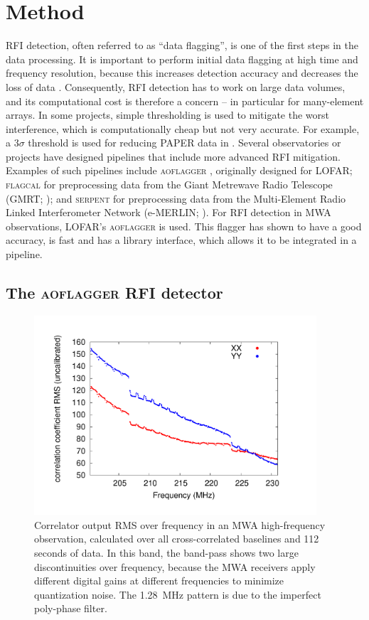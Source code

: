 \documentclass{pasa}
\begin{document}
\section{Method}
RFI detection, often referred to as ``data flagging'', is one of the first steps in the data processing. It is important to perform initial data flagging at high time and frequency resolution, because this increases detection accuracy and decreases the loss of data \citep{lofar-radio-environment}. Consequently, RFI detection has to work on large data volumes, and its computational cost is therefore a concern -- in particular for many-element arrays. In some projects, simple thresholding is used to mitigate the worst interference, which is computationally cheap but not very accurate. For example, a $3\sigma$ threshold is used for reducing PAPER data in \citet{parsons-paper-eorlimit-2014}. Several observatories or projects have designed pipelines that include more advanced RFI mitigation. Examples of such pipelines include \textsc{aoflagger} \citep{post-correlation-rfi-classification,scale-invariant-rank-operator}, originally designed for LOFAR; \textsc{flagcal} for preprocessing data from the Giant Metrewave Radio Telescope (GMRT; \citealt{prasad-flagcal-2012}); and \textsc{serpent} for preprocessing data from the Multi-Element Radio Linked Interferometer Network (e-MERLIN; \citealt{serpent-peck-2013}). For RFI detection in MWA observations, LOFAR's \textsc{aoflagger} is used. This flagger has shown to have a good accuracy, is fast and has a library interface, which allows it to be integrated in a pipeline.

\subsection{The \textsc{aoflagger} RFI detector}

\begin{figure}
\begin{center}\hspace*{-0.8cm}\includegraphics[width=10.5cm]{img/bandpass}
\caption{Correlator output RMS over frequency in an MWA high-frequency observation, calculated over all cross-correlated baselines and 112 seconds of data. In this band, the band-pass shows two large discontinuities over frequency, because the MWA receivers apply different digital gains at different frequencies to minimize quantization noise. The 1.28~MHz pattern is due to the imperfect poly-phase filter.
}
\label{fig:bandpass}
\end{center}
\end{figure}
\end{document}
